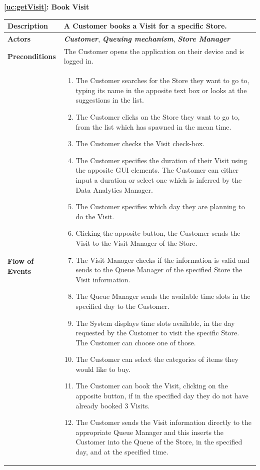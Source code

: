 \documentclass[a4paper, 12pt, oneside]{article}
\begin{document}
\begin{center}
{\textbf{\ref{uc:getVisit}: Book Visit}}
\end{center}
\begin{tabularx}{\linewidth}{| l | X |}
	
	\hline
	\textbf{Description} & A Customer books a Visit for a specific Store.\\
	

	\hline
	\textbf{Actors} & \textbf{\textit{Customer}}, \textit{\textbf{Queuing mechanism}}, \textbf{\textit{Store Manager}}\\
	
	\hline
	\textbf{Preconditions} & The Customer opens the application on their device and is logged in.\\
	
	\hline
	\textbf{Flow of Events} & \parbox{0.7\textwidth}{	
		\begin{enumerate}
			\item The Customer searches for the Store they want to go to, typing its name in the apposite text box or looks at the suggestions in the list.
			\item The Customer clicks on the Store they want to go to, from the list which has spawned in the mean time.
			\item The Customer checks the Visit check-box.
			\item The Customer specifies the duration of their Visit using the apposite GUI elements. The Customer can either input a duration or select one which is inferred by the Data Analytics Manager.
			\item The Customer specifies which day they are planning to do the Visit.
			\item Clicking the apposite button, the Customer sends the Visit to the Visit Manager of the Store.
			\item The Visit Manager checks if the information is valid and sends to the Queue Manager of the specified Store the Visit information.
			\item The Queue Manager sends the available time slots in the specified day to the Customer.
			\item The System displays time slots available, in the day requested by the Customer to visit the specific Store. The Customer can choose one of those.
			\item The Customer can select the categories of items they would like to buy.
			\item The Customer can book the Visit, clicking on the apposite button, if in the specified day they do not have already booked 3 Visits.
			\item The Customer sends the Visit information directly to the appropriate Queue Manager and this inserts the Customer into the Queue of the Store, in the specified day, and at the specified time.
	\end{enumerate}}\\
	

\end{tabularx}
\end{document}
